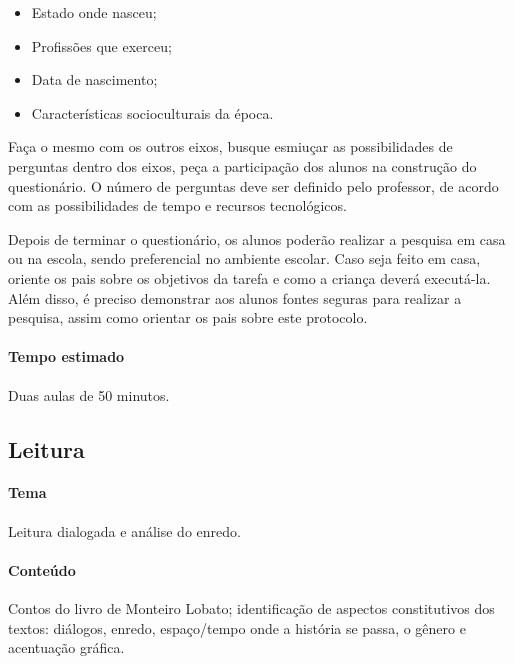 \documentclass[11pt]{extarticle}
\begin{document}
\begin{itemize}
\item Estado onde nasceu;

\item Profissões que exerceu;

\item Data de nascimento;

\item Características socioculturais da época.
\end{itemize}

Faça o mesmo com os outros eixos, busque esmiuçar as possibilidades de perguntas dentro dos eixos, peça a participação dos alunos na construção do questionário. O número de perguntas deve ser definido pelo professor, de acordo com as possibilidades de tempo e recursos tecnológicos. 

Depois de terminar o questionário, os alunos poderão realizar a pesquisa em casa ou na escola, sendo preferencial no ambiente escolar. Caso seja feito em casa, oriente os pais sobre os objetivos da tarefa e como a criança deverá executá-la. Além disso, é preciso demonstrar aos alunos fontes seguras para realizar a pesquisa, assim como orientar os pais sobre este protocolo. 


\paragraph{Tempo estimado} Duas aulas de 50 minutos.


\subsection{Leitura}

\paragraph{Tema} Leitura dialogada e análise do enredo.

\paragraph{Conteúdo} Contos do livro de Monteiro Lobato; identificação de aspectos constitutivos dos textos: diálogos, enredo, espaço/tempo onde a história se passa, o gênero e acentuação gráfica.
\end{document}
